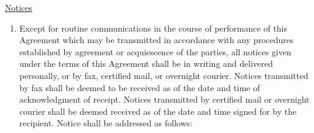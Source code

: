 \underline{Notices}
\begin{enumerate}[
    ref = \SecondLevelEnumerator
]
    \item Except for routine communications in the course of performance of
    this Agreement which may be transmitted in accordance with any
    procedures established by agreement or acquiescence of the parties, all
    notices given under the terms of this Agreement shall be in writing and
    delivered personally, or by fax, certified mail, or overnight courier.
    Notices transmitted by fax shall be deemed to be received as of the
    date and time of acknowledgment of receipt. Notices transmitted by
    certified mail or overnight courier shall be deemed received as of the
    date and time signed for by the recipient. Notice shall be addressed as
    follows:
\end{enumerate}